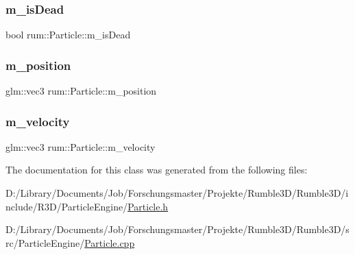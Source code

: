 \mbox{\label{classrum_1_1_particle_ab056fc8b2187694c0742bd234b9cc6a3}} 
\subsubsection{\texorpdfstring{m\+\_\+is\+Dead}{m\_isDead}}
{\footnotesize\ttfamily bool rum\+::\+Particle\+::m\+\_\+is\+Dead\hspace{0.3cm}{\ttfamily [protected]}}

\mbox{\label{classrum_1_1_particle_a6e7c397b620c9d03fb6c7d4359649d40}} 
\subsubsection{\texorpdfstring{m\+\_\+position}{m\_position}}
{\footnotesize\ttfamily glm\+::vec3 rum\+::\+Particle\+::m\+\_\+position\hspace{0.3cm}{\ttfamily [protected]}}

\mbox{\label{classrum_1_1_particle_a8dfab481a4ef728d40e86f7369baf307}} 
\subsubsection{\texorpdfstring{m\+\_\+velocity}{m\_velocity}}
{\footnotesize\ttfamily glm\+::vec3 rum\+::\+Particle\+::m\+\_\+velocity\hspace{0.3cm}{\ttfamily [protected]}}



The documentation for this class was generated from the following files\+:\begin{DoxyCompactItemize}
\item 
D\+:/\+Library/\+Documents/\+Job/\+Forschungsmaster/\+Projekte/\+Rumble3\+D/\+Rumble3\+D/include/\+R3\+D/\+Particle\+Engine/\mbox{\hyperlink{_particle_8h}{Particle.\+h}}\item 
D\+:/\+Library/\+Documents/\+Job/\+Forschungsmaster/\+Projekte/\+Rumble3\+D/\+Rumble3\+D/src/\+Particle\+Engine/\mbox{\hyperlink{_particle_8cpp}{Particle.\+cpp}}\end{DoxyCompactItemize}
